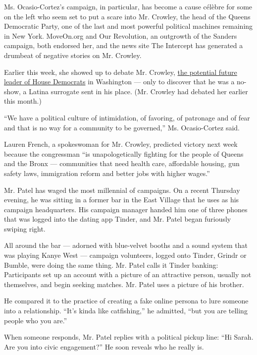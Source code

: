 Ms. Ocasio-Cortez's campaign, in particular, has become a cause célèbre
for some on the left who seem set to put a scare into Mr. Crowley, the
head of the Queens Democratic Party, one of the last and most powerful
political machines remaining in New York. MoveOn.org and Our Revolution,
an outgrowth of the Sanders campaign, both endorsed her, and the news
site The Intercept has generated a drumbeat of negative stories on Mr.
Crowley.

Earlier this week, she showed up to debate Mr. Crowley,
\href{https://www.rollcall.com/news/hawkings/joseph-crowley-democratic-leadership}{the
potential future leader of House Democrats} in Washington --- only to
discover that he was a no-show, a Latina surrogate sent in his place.
(Mr. Crowley had debated her earlier this month.)

``We have a political culture of intimidation, of favoring, of patronage
and of fear and that is no way for a community to be governed,'' Ms.
Ocasio-Cortez said.

Lauren French, a spokeswoman for Mr. Crowley, predicted victory next
week because the congressman ``is unapologetically fighting for the
people of Queens and the Bronx --- communities that need health care,
affordable housing, gun safety laws, immigration reform and better jobs
with higher wages.''

Mr. Patel has waged the most millennial of campaigns. On a recent
Thursday evening, he was sitting in a former bar in the East Village
that he uses as his campaign headquarters. His campaign manager handed
him one of three phones that was logged into the dating app Tinder, and
Mr. Patel began furiously swiping right.

All around the bar --- adorned with blue-velvet booths and a sound
system that was playing Kanye West --- campaign volunteers, logged onto
Tinder, Grindr or Bumble, were doing the same thing. Mr. Patel calls it
Tinder banking: Participants set up an account with a picture of an
attractive person, usually not themselves, and begin seeking matches.
Mr. Patel uses a picture of his brother.

He compared it to the practice of creating a fake online persona to lure
someone into a relationship. ``It's kinda like catfishing,'' he
admitted, ``but you are telling people who you are.''

When someone responds, Mr. Patel replies with a political pickup line:
``Hi Sarah. Are you into civic engagement?'' He soon reveals who he
really is.

